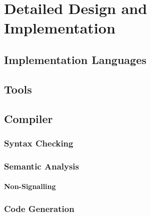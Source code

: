 \documentclass[report.tex]{subfiles}
\begin{document}
\chapter{Detailed Design and Implementation} %
\label{cha:detailed_design_and_implementation}
\section{Implementation Languages} %
\label{sec:implementation_languages}

\section{Tools} %
\label{sec:tools}

\section{Compiler} %
\label{sec:compiler}
\subsection{Syntax Checking} %
\label{sub:syntax_checking}

\subsection{Semantic Analysis} %
\label{sub:semantic_analysis}
\subsubsection{Non-Signalling} %
\label{ssub:non_signalling}

\subsection{Code Generation} %
\label{sub:code_generation}

\newpage
\end{document}
